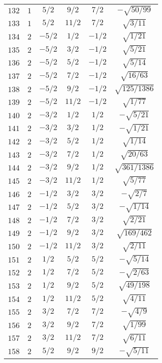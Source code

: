 \begin{table}
\begin{center}
\begin{tabular}{|c|c|c|c|c|c|}
$132$ & $1$ & $5/2$ & $9/2$ & $7/2$ & $-\sqrt{50/99}$ \\ 
$133$ & $1$ & $5/2$ & $11/2$ & $7/2$ & $\sqrt{3/11}$ \\ 
$134$ & $2$ & $-5/2$ & $1/2$ & $-1/2$ & $\sqrt{1/21}$ \\ 
$135$ & $2$ & $-5/2$ & $3/2$ & $-1/2$ & $\sqrt{5/21}$ \\ 
$136$ & $2$ & $-5/2$ & $5/2$ & $-1/2$ & $\sqrt{5/14}$ \\ 
$137$ & $2$ & $-5/2$ & $7/2$ & $-1/2$ & $\sqrt{16/63}$ \\ 
$138$ & $2$ & $-5/2$ & $9/2$ & $-1/2$ & $\sqrt{125/1386}$ \\ 
$139$ & $2$ & $-5/2$ & $11/2$ & $-1/2$ & $\sqrt{1/77}$ \\ 
$140$ & $2$ & $-3/2$ & $1/2$ & $1/2$ & $-\sqrt{5/21}$ \\ 
$141$ & $2$ & $-3/2$ & $3/2$ & $1/2$ & $-\sqrt{1/21}$ \\ 
$142$ & $2$ & $-3/2$ & $5/2$ & $1/2$ & $\sqrt{1/14}$ \\ 
$143$ & $2$ & $-3/2$ & $7/2$ & $1/2$ & $\sqrt{20/63}$ \\ 
$144$ & $2$ & $-3/2$ & $9/2$ & $1/2$ & $\sqrt{361/1386}$ \\ 
$145$ & $2$ & $-3/2$ & $11/2$ & $1/2$ & $\sqrt{5/77}$ \\ 
$146$ & $2$ & $-1/2$ & $3/2$ & $3/2$ & $-\sqrt{2/7}$ \\ 
$147$ & $2$ & $-1/2$ & $5/2$ & $3/2$ & $-\sqrt{1/14}$ \\ 
$148$ & $2$ & $-1/2$ & $7/2$ & $3/2$ & $\sqrt{2/21}$ \\ 
$149$ & $2$ & $-1/2$ & $9/2$ & $3/2$ & $\sqrt{169/462}$ \\ 
$150$ & $2$ & $-1/2$ & $11/2$ & $3/2$ & $\sqrt{2/11}$ \\ 
$151$ & $2$ & $1/2$ & $5/2$ & $5/2$ & $-\sqrt{5/14}$ \\ 
$152$ & $2$ & $1/2$ & $7/2$ & $5/2$ & $-\sqrt{2/63}$ \\ 
$153$ & $2$ & $1/2$ & $9/2$ & $5/2$ & $\sqrt{49/198}$ \\ 
$154$ & $2$ & $1/2$ & $11/2$ & $5/2$ & $\sqrt{4/11}$ \\ 
$155$ & $2$ & $3/2$ & $7/2$ & $7/2$ & $-\sqrt{4/9}$ \\ 
$156$ & $2$ & $3/2$ & $9/2$ & $7/2$ & $\sqrt{1/99}$ \\ 
$157$ & $2$ & $3/2$ & $11/2$ & $7/2$ & $\sqrt{6/11}$ \\ 
$158$ & $2$ & $5/2$ & $9/2$ & $9/2$ & $-\sqrt{5/11}$ \\ 

\end{tabular}
\end{center}
\end{table}
